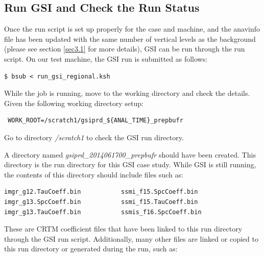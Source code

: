 \subsection{Run GSI and Check the Run Status}
\label{sec5.1.2}

Once the run script is set up properly for the case and machine, and the anavinfo file has been updated with the same number of vertical levels as the background (please see section \ref{sec3.1} for more details), GSI can be run through the run script. On our test machine, the GSI run is submitted as follows:

\begin{scriptsize}
\begin{verbatim}
$ bsub < run_gsi_regional.ksh
\end{verbatim}
\end{scriptsize}

While the job is running, move to the working directory and check the details. Given the following working directory setup:

\begin{scriptsize}
\begin{verbatim}
 WORK_ROOT=/scratch1/gsiprd_${ANAL_TIME}_prepbufr
\end{verbatim}
\end{scriptsize}

Go to directory \textit{/scratch1} to check the GSI run directory.

A directory named \textit{gsiprd\_2014061700\_prepbufr} should have been created.  This directory is the run directory for this GSI case study.  While GSI is still running, the contents of this directory should include files such as:

\begin{scriptsize}
\begin{verbatim}
imgr_g12.TauCoeff.bin        	ssmi_f15.SpcCoeff.bin
imgr_g13.SpcCoeff.bin        	ssmi_f15.TauCoeff.bin
imgr_g13.TauCoeff.bin        	ssmis_f16.SpcCoeff.bin
\end{verbatim}
\end{scriptsize}

These are CRTM coefficient files that have been linked to this run directory through the GSI run script.  Additionally, many other files are linked or copied to this run directory or generated during the run, such as:

